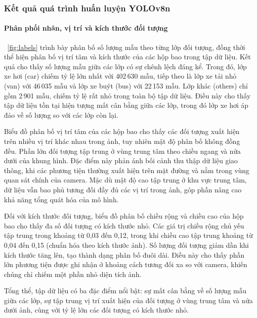 \subsubsection{Kết quả quá trình huấn luyện YOLOv8n}

\paragraph{Phân phối nhãn, vị trí và kích thước đối tượng}

\figurename~\ref{fig:labels} trình bày phân bố số lượng mẫu theo từng
lớp đối tượng, đồng thời thể hiện phân bố vị trí tâm và kích thước của
các hộp bao trong tập dữ liệu. Kết quả cho thấy số lượng mẫu giữa các
lớp có sự chênh lệch đáng kể. Trong đó, lớp xe hơi (car) chiếm tỷ lệ
lớn nhất với 402\,630 mẫu, tiếp theo là lớp xe tải nhỏ (van) với
46\,035 mẫu và lớp xe buýt (bus) với 22\,153 mẫu. Lớp khác (others)
chỉ gồm 2\,901 mẫu, chiếm tỷ lệ rất nhỏ trong toàn bộ tập dữ liệu.
Điều này cho thấy tập dữ liệu tồn tại hiện tượng mất cân bằng giữa các
lớp, trong đó lớp xe hơi áp đảo về số lượng so với các lớp còn lại.

Biểu đồ phân bố vị trí tâm của các hộp bao cho thấy các đối tượng xuất
hiện trên nhiều vị trí khác nhau trong ảnh, tuy nhiên mật độ phân bố
không đồng đều. Phần lớn đối tượng tập trung ở vùng trung tâm theo
chiều ngang và nửa dưới của khung hình. Đặc điểm này phản ánh bối cảnh
thu thập dữ liệu giao thông, khi các phương tiện thường xuất hiện trên
mặt đường và nằm trong vùng quan sát chính của camera. Mặc dù mật độ
cao tập trung ở khu vực trung tâm, dữ liệu vẫn bao phủ tương đối đầy đủ
các vị trí trong ảnh, góp phần nâng cao khả năng tổng quát hóa của mô
hình.

Đối với kích thước đối tượng, biểu đồ phân bố chiều rộng và chiều cao
của hộp bao cho thấy đa số đối tượng có kích thước nhỏ. Các giá trị
chiều rộng chủ yếu tập trung trong khoảng từ 0,03 đến 0,12, trong khi
chiều cao tập trung khoảng từ 0,04 đến 0,15 (chuẩn hóa theo kích thước
ảnh). Số lượng đối tượng giảm dần khi kích thước tăng lên, tạo thành
dạng phân bố đuôi dài. Điều này cho thấy phần lớn phương tiện được ghi
nhận ở khoảng cách tương đối xa so với camera, khiến chúng chỉ chiếm
một phần nhỏ diện tích ảnh.

Tổng thể, tập dữ liệu có ba đặc điểm nổi bật: sự mất cân bằng về số
lượng mẫu giữa các lớp, sự tập trung vị trí xuất hiện của đối tượng ở
vùng trung tâm và nửa dưới ảnh, cùng với tỷ lệ lớn các đối tượng có
kích thước nhỏ.

